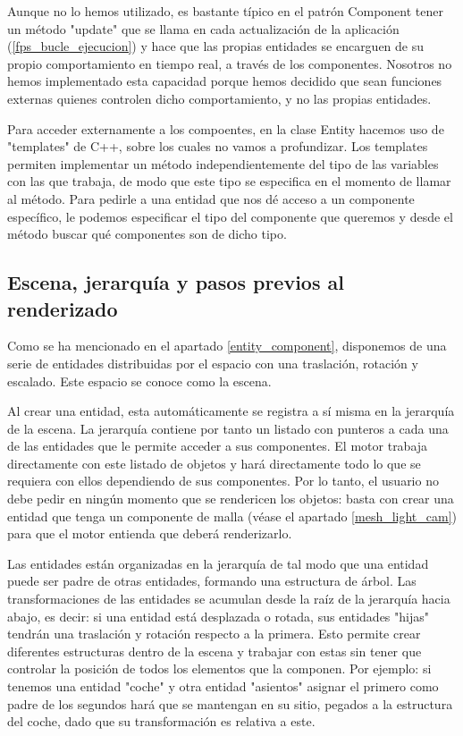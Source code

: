 Aunque no lo hemos utilizado, es bastante típico en el patrón Component tener un método "update" que se llama en cada actualización de la aplicación (\ref{fps_bucle_ejecucion}) y hace que las propias entidades se encarguen de su propio comportamiento en tiempo real, a través de los componentes. Nosotros no hemos implementado esta capacidad porque hemos decidido que sean funciones externas quienes controlen dicho comportamiento, y no las propias entidades.

Para acceder externamente a los compoentes, en la clase Entity hacemos uso de "templates" de C++, sobre los cuales no vamos a profundizar. Los templates permiten implementar un método independientemente del tipo de las variables con las que trabaja, de modo que este tipo se especifica en el momento de llamar al método. Para pedirle a una entidad que nos dé acceso a un componente específico, le podemos especificar el tipo del componente que queremos y desde el método buscar qué componentes son de dicho tipo.

\subsection{Escena, jerarquía y pasos previos al renderizado}
\label{scene_hierarchy}
Como se ha mencionado en el apartado \ref{entity_component}, disponemos de una serie de entidades distribuidas por el espacio con una traslación, rotación y escalado. Este espacio se conoce como la escena.

Al crear una entidad, esta automáticamente se registra a sí misma en la jerarquía de la escena. La jerarquía contiene por tanto un listado con punteros a cada una de las entidades que le permite acceder a sus componentes. El motor trabaja directamente con este listado de objetos y hará directamente todo lo que se requiera con ellos dependiendo de sus componentes. Por lo tanto, el usuario no debe pedir en ningún momento que se rendericen los objetos: basta con crear una entidad que tenga un componente de malla (véase el apartado \ref{mesh_light_cam}) para que el motor entienda que deberá renderizarlo.

Las entidades están organizadas en la jerarquía de tal modo que una entidad puede ser padre de otras entidades, formando una estructura de árbol. Las transformaciones de las entidades se acumulan desde la raíz de la jerarquía hacia abajo, es decir: si una entidad está desplazada o rotada, sus entidades "hijas" tendrán una traslación y rotación respecto a la primera. Esto permite crear diferentes estructuras dentro de la escena y trabajar con estas sin tener que controlar la posición de todos los elementos que la componen. Por ejemplo: si tenemos una entidad "coche" y otra entidad "asientos" asignar el primero como padre de los segundos hará que se mantengan en su sitio, pegados a la estructura del coche, dado que su transformación es relativa a este.

